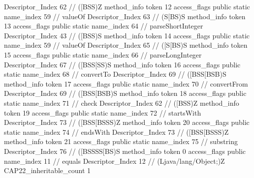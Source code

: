 {{{{{					Descriptor_Index	62		// ([BSS)Z
				}
				method_info {
					token	12
					access_flags	public static
					name_index	59		// valueOf
					Descriptor_Index	63		// (S[BS)S
				}
				method_info {
					token	13
					access_flags	public static
					name_index	64		// parseShortInteger
					Descriptor_Index	43		// ([BSS)S
				}
				method_info {
					token	14
					access_flags	public static
					name_index	59		// valueOf
					Descriptor_Index	65		// ([S[BS)S
				}
				method_info {
					token	15
					access_flags	public static
					name_index	66		// parseLongInteger
					Descriptor_Index	67		// ([BSS[SS)S
				}
				method_info {
					token	16
					access_flags	public static
					name_index	68		// convertTo
					Descriptor_Index	69		// ([BSS[BSB)S
				}
				method_info {
					token	17
					access_flags	public static
					name_index	70		// convertFrom
					Descriptor_Index	69		// ([BSS[BSB)S
				}
				method_info {
					token	18
					access_flags	public static
					name_index	71		// check
					Descriptor_Index	62		// ([BSS)Z
				}
				method_info {
					token	19
					access_flags	public static
					name_index	72		// startsWith
					Descriptor_Index	73		// ([BSS[BSSS)Z
				}
				method_info {
					token	20
					access_flags	public static
					name_index	74		// endsWith
					Descriptor_Index	73		// ([BSS[BSSS)Z
				}
				method_info {
					token	21
					access_flags	public static
					name_index	75		// substring
					Descriptor_Index	76		// ([BSSSS[BS)S
				}
				method_info {
					token	0
					access_flags	public
					name_index	11		// equals
					Descriptor_Index	12		// (Ljava/lang/Object;)Z
				}
			}
			CAP22_inheritable_count	1
		}
	}
}
